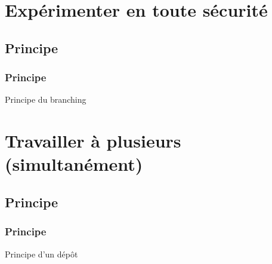 \documentclass[t]{beamer}
\begin{document}
\section{Exp\'erimenter en toute s\'ecurit\'e}
\subsection{Principe}
\begin{frame}
        \frametitle{Principe}
        Principe du branching
\end{frame}

\section{Travailler \`a plusieurs (simultan\'ement) }
\subsection{Principe}
\begin{frame}
        \frametitle{Principe}
        Principe d'un d\'ep\^ot
\end{frame}
\end{document}
